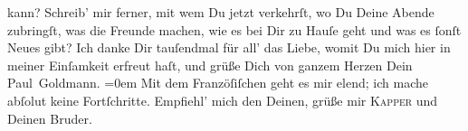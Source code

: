 \begin{ledgroupsized}[t]{13cm}
               kann?\pend
           \pstart
           Schreib’ mir ferner, mit wem Du jetzt verkehrſt, wo Du Deine Abende zubringſt, was
                  {\pb}die Freunde machen, wie es bei Dir zu Hauſe geht
               und was es ſonſt Neues gibt?\pend
           \pstart
           Ich danke Dir tauſendmal für all’ das Liebe, womit Du mich hier in meiner Einſamkeit
               erfreut haſt, und grüße Dich von ganzem Herzen\pend
           \pstart
           Dein \damage{\textcolor{gray}{treuer}}{\\[\baselineskip]}\spacefill\mbox{Paul Goldmann.}\pend
           \leftskip=0em{}\pstart
           \noindent{}Mit dem Franzöſiſchen geht es mir elend; ich mache abſolut keine Fortſchritte.\pend
           \pstart
           Empfiehl’ mich den Deinen, grüße mir \textsc{Kapper} und Deinen Bruder.\pend
           
         
         \endnumbering{}\end{ledgroupsized}  \newcommand{\dateiname}{L02668}\newcommand{\titel}{Paul Goldmann an Arthur Schnitzler, 4. 8. 1891}\newcommand{\editorInnen}{Martin Anton Müller und Laura Untner}
      